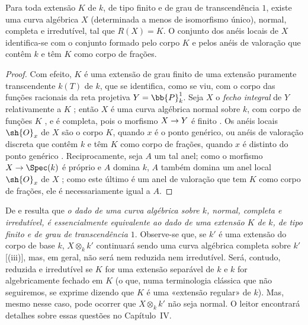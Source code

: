 \documentclass[oneside,10pt]{amsart}
\makeatletter
\newcommand{\ega@arrow}[2]{\mathchoice{#1}{#2}{#2}{#2}}
\renewcommand{\to}{\ega@arrow{\longrightarrow}{\rightarrow}}
\let\EGAOriginalLabel\label
\renewcommand{\label}[1]{\phantomsection\EGAOriginalLabel{#1}}
\makeatother
\begin{document}
\begin{proposition}[7.4.18]
\label{II.7.4.18}
Para toda extensão $K$ de $k$, de tipo finito e de grau de transcendência $1$, existe uma curva algébrica $X$ (determinada a menos de isomorfismo único), normal, completa e irredutível, tal que $R(X)=K$.
O conjunto dos anéis locais de $X$ identifica-se  com o conjunto formado pelo corpo $K$ e pelos anéis de valoração que contêm $k$ e têm $K$ como corpo de frações.
\end{proposition}

\begin{proof}
Com efeito, $K$ é uma extensão de grau finito de uma extensão puramente transcendente $k(T)$ de $k$, que se identifica, como se viu, com o corpo das funções racionais da reta projetiva $Y=\bb{P}_k^1$.
Seja $X$ o \emph{fecho integral} de $Y$ relativamente a $K$ ;
então $X$ é uma curva algébrica normal sobre $k$, com corpo de funções $K$ , e é completa, pois o morfismo $X\to Y$ é finito .
Os anéis locais $\sh{O}_x$ de $X$ são o corpo $K$, quando $x$ é o ponto genérico, ou anéis de valoração discreta que contêm $k$ e têm $K$ como corpo de frações, quando $x$ é distinto do ponto genérico .
Reciprocamente, seja $A$ um tal anel;
como o morfismo $X\to\Spec(k)$ é próprio e $A$ domina $k$, $A$ também domina um anel local $\sh{O}_x$ de $X$ ;
como este último é um anel de valoração que tem $K$ como corpo de frações, ele é necessariamente igual a $A$.
\end{proof}

\begin{remarks}[7.4.19]
\label{II.7.4.19}
De  e  resulta que \emph{o dado de uma curva algébrica sobre $k$, normal, completa e irredutível, é essencialmente equivalente ao dado de uma extensão $K$ de $k$, de tipo finito e de grau de transcendência $1$}.
Observe-se que, se $k'$ é uma extensão do corpo de base $k$, $X\otimes_k k'$ continuará sendo uma curva algébrica completa sobre $k'$ [(iii)], mas, em geral, não será nem reduzida nem irredutível.
Será, contudo, reduzida e irredutível se $K$ for uma extensão separável de $k$ e $k$ for algebricamente fechado em $K$ (o que, numa terminologia clássica que não seguiremos, se exprime dizendo que $K$ é uma «extensão regular» de $k$).
Mas, mesmo nesse caso, pode ocorrer que $X\otimes_k k'$ não seja normal.
O leitor encontrará detalhes sobre essas questões no Capítulo~IV.
\end{remarks}
\end{document}
